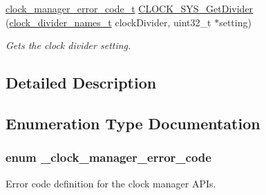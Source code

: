 \begin{DoxyCompactItemize}
\hyperlink{group__clock__manager_ga384b25940eac5c28dceb4e11131818da}{clock\+\_\+manager\+\_\+error\+\_\+code\+\_\+t} \hyperlink{group__clock__manager_ga47be42a2115e8de1ab5d27c9a4c06330}{C\+L\+O\+C\+K\+\_\+\+S\+Y\+S\+\_\+\+Get\+Divider} (\hyperlink{group__sim__hal_ga51a225b8eb0e0d00e7911b3603d7caa2}{clock\+\_\+divider\+\_\+names\+\_\+t} clock\+Divider, uint32\+\_\+t $\ast$setting)
\begin{DoxyCompactList}\small\item\em Gets the clock divider setting. \end{DoxyCompactList}\end{DoxyCompactItemize}


\subsection{Detailed Description}


\subsection{Enumeration Type Documentation}
\subsubsection[{\texorpdfstring{\+\_\+clock\+\_\+manager\+\_\+error\+\_\+code}{_clock_manager_error_code}}]{\setlength{\rightskip}{0pt plus 5cm}enum {\bf \+\_\+clock\+\_\+manager\+\_\+error\+\_\+code}}\hypertarget{group__clock__manager_gabd583c936fb62bc8e25cd4273b8447f0}{}\label{group__clock__manager_gabd583c936fb62bc8e25cd4273b8447f0}


Error code definition for the clock manager A\+P\+Is. 

